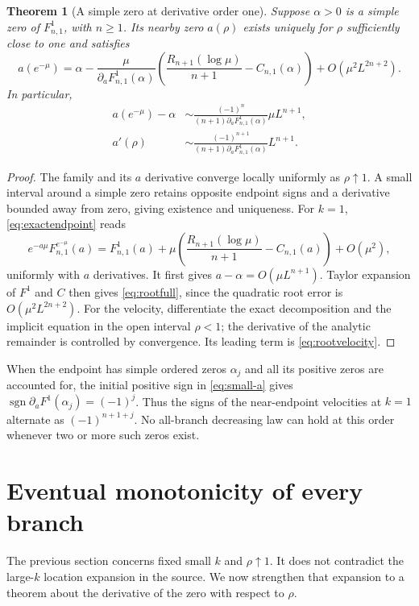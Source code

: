 \documentclass[11pt]{article}
\numberwithin{equation}{section}
\newtheorem{theorem}{Theorem}[section]
\theoremstyle{definition}\newtheorem{definition}[theorem]{Definition}
\theoremstyle{remark}\newtheorem{remark}[theorem]{Remark}
\DeclareMathOperator{\sgn}{sgn}
\begin{document}
\begin{theorem}[A simple zero at derivative order one]\label{thm:rootendpoint}
Suppose $\alpha>0$ is a simple zero of $F_{n,1}^{1}$, with $n\geq1$. Its nearby zero $a(\rho)$ exists uniquely for $\rho$ sufficiently close to one and satisfies
\begin{equation}\label{eq:rootfull}
a(e^{-\mu})=\alpha-
\frac{\mu}{\partial_aF_{n,1}^{1}(\alpha)}
\left(\frac{R_{n+1}(\log\mu)}{n+1}-C_{n,1}(\alpha)\right)
+O\!\left(\mu^2L^{2n+2}\right).
\end{equation}
In particular,
\begin{align}
a(e^{-\mu})-\alpha
&\sim \frac{(-1)^n}{(n+1)\partial_aF_{n,1}^{1}(\alpha)}\mu L^{n+1},\label{eq:rootlead}\\
a'(\rho)
&\sim \frac{(-1)^{n+1}}{(n+1)\partial_aF_{n,1}^{1}(\alpha)}L^{n+1}.\label{eq:rootvelocity}
\end{align}
\end{theorem}
\begin{proof}
The family and its $a$ derivative converge locally uniformly as $\rho\uparrow1$. A small interval around a simple zero retains opposite endpoint signs and a derivative bounded away from zero, giving existence and uniqueness. For $k=1$, \eqref{eq:exactendpoint} reads
\[
e^{-a\mu}F_{n,1}^{e^{-\mu}}(a)
=F_{n,1}^{1}(a)+\mu\left(\frac{R_{n+1}(\log\mu)}{n+1}-C_{n,1}(a)\right)+O(\mu^2),
\]
uniformly with $a$ derivatives. It first gives $a-\alpha=O(\mu L^{n+1})$. Taylor expansion of $F^1$ and $C$ then gives \eqref{eq:rootfull}, since the quadratic root error is $O(\mu^2L^{2n+2})$. For the velocity, differentiate the exact decomposition and the implicit equation in the open interval $\rho<1$; the derivative of the analytic remainder is controlled by convergence. Its leading term is \eqref{eq:rootvelocity}.
\end{proof}

When the endpoint has simple ordered zeros $\alpha_j$ and all its positive zeros are accounted for, the initial positive sign in \eqref{eq:small-a} gives
$\sgn\partial_aF^1(\alpha_j)=(-1)^j$. Thus the signs of the near-endpoint velocities at $k=1$ alternate as $(-1)^{n+1+j}$. No all-branch decreasing law can hold at this order whenever two or more such zeros exist.

\section{Eventual monotonicity of every branch}\label{sec:eventual}
The previous section concerns fixed small $k$ and $\rho\uparrow1$. It does not contradict the large-$k$ location expansion in the source. We now strengthen that expansion to a theorem about the derivative of the zero with respect to $\rho$.
\end{document}
